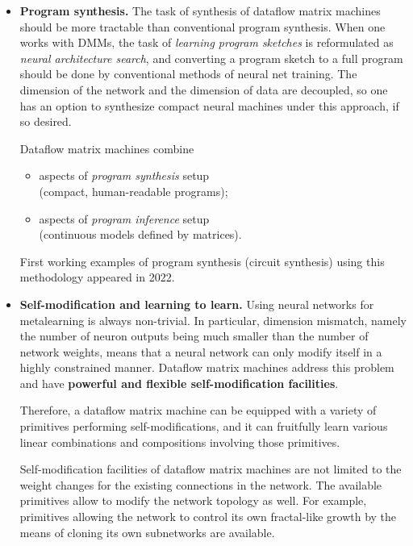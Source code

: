 \documentclass{article}
\begin{document}
\begin{itemize}

  \item {\bf Program synthesis.} The task of synthesis of dataflow matrix machines
should be more tractable than conventional program synthesis. When one works with DMMs, the task of
{\em learning program sketches} is reformulated as {\em neural architecture search},
and converting a program sketch to a full program should be done by
conventional methods of neural net training. The dimension of the network and the dimension
of data are decoupled, so one has an option to synthesize compact neural machines
under this approach, if so desired.

\vspace{0.1in}
Dataflow matrix machines combine

  \begin{itemize}
      \item aspects of {\em program synthesis} setup\\ (compact, human-readable programs);
      \item aspects of {\em program inference} setup\\ (continuous models defined by matrices).
  \end{itemize}

First working examples of program synthesis (circuit synthesis) using this methodology appeared in 2022.

\vspace{0.1in}
\item {\bf Self-modification and learning to learn.} Using neural networks for metalearning
is always non-trivial. In particular, dimension mismatch, namely the number of neuron outputs 
being much smaller than the number of network weights,
means that a neural network
can only modify itself in a highly constrained manner. Dataflow matrix machines address
this problem and have {\bf powerful and flexible self-modification facilities}.

\vspace{0.1in}
Therefore, a dataflow matrix machine can be equipped with a variety of primitives
performing self-modifications, and it can fruitfully learn various linear combinations and
compositions involving those primitives.

\vspace{0.1in}
Self-modification facilities of dataflow matrix machines are not limited to the weight
changes for the existing connections in the network. The available primitives allow to
modify the network topology as well. For example, primitives allowing the network
to control its own fractal-like growth by the means of cloning its own subnetworks
are available.


\end{itemize}
\end{document}
